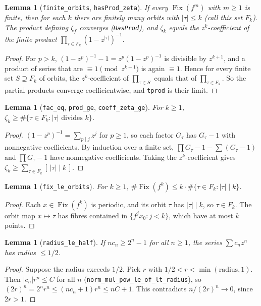 \documentclass[11pt]{article}
\newtheorem{lemma}[theorem]{Lemma}
\theoremstyle{definition}
\newcommand{\Fix}{\operatorname{Fix}}
\begin{document}
\begin{lemma}[\texttt{finite\_orbits}, \texttt{hasProd\_zeta}]
If every $\Fix(f^m)$ with $m\ge1$ is finite, then for each $k$ there are finitely many orbits with
$|\tau|\le k$ (call this set $F_k$). The product defining $\zeta_f$ converges (\texttt{HasProd}), and
$\zeta_k$ equals the $z^k$-coefficient of the finite product $\prod_{\tau\in F_k}(1-z^{|\tau|})^{-1}$.
\end{lemma}
\begin{proof}
For $p>k$, $(1-z^p)^{-1}-1=z^p(1-z^p)^{-1}$ is divisible by $z^{k+1}$, and a product of series that are
$\equiv1 \pmod{z^{k+1}}$ is again $\equiv1$. Hence for every finite set $S\supseteq F_k$ of orbits, the
$z^k$-coefficient of $\prod_{\tau\in S}$ equals that of $\prod_{\tau\in F_k}$. So the partial products
converge coefficientwise, and \texttt{tprod} is their limit.
\end{proof}

\begin{lemma}[\texttt{fac\_eq}, \texttt{prod\_ge}, \texttt{coeff\_zeta\_ge}]
For $k\ge1$, $\zeta_k\ge\#\{\tau\in F_k: |\tau|\text{ divides }k\}$.
\end{lemma}
\begin{proof}
$(1-z^p)^{-1}=\sum_{p\mid j}z^j$ for $p\ge1$, so each factor $G_\tau$ has $G_\tau-1$ with nonnegative
coefficients. By induction over a finite set, $\prod G_\tau-1-\sum(G_\tau-1)$ and $\prod G_\tau-1$
have nonnegative coefficients. Taking the $z^k$-coefficient gives
$\zeta_k\ge\sum_{\tau\in F_k}[\,|\tau|\mid k\,]$.
\end{proof}

\begin{lemma}[\texttt{fix\_le\_orbits}]
For $k\ge1$, $\#\Fix(f^k)\le k\cdot\#\{\tau\in F_k:|\tau|\mid k\}$.
\end{lemma}
\begin{proof}
Each $x\in\Fix(f^k)$ is periodic, and its orbit $\tau$ has $|\tau|\mid k$, so $\tau\in F_k$. The orbit
map $x\mapsto\tau$ has fibres contained in $\{f^jx_0:j<k\}$, which have at most $k$ points.
\end{proof}

\begin{lemma}[\texttt{radius\_le\_half}]
If $n c_n\ge2^n-1$ for all $n\ge1$, the series $\sum c_n z^n$ has radius $\le1/2$.
\end{lemma}
\begin{proof}
Suppose the radius exceeds $1/2$. Pick $r$ with $1/2<r<\min(\text{radius},1)$. Then
$|c_n|r^n\le C$ for all $n$ (\texttt{norm\_mul\_pow\_le\_of\_lt\_radius}), so
$(2r)^n=2^nr^n\le(nc_n+1)r^n\le nC+1$. This contradicts $n/(2r)^n\to0$, since $2r>1$.
\end{proof}
\end{document}

